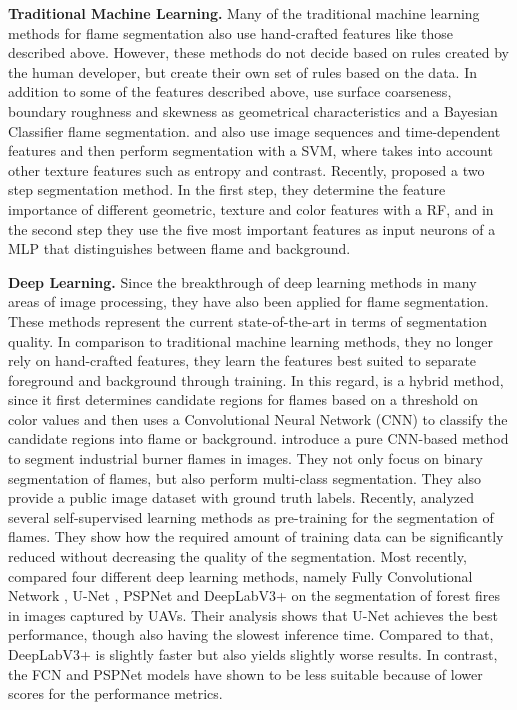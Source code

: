 \documentclass{isprs} %
\begin{document}
\textbf{Traditional Machine Learning.}
Many of the traditional machine learning methods for flame segmentation also use hand-crafted features like those described above. However, these methods do not decide based on rules created by the human developer, but create their own set of rules based on the data. In addition to some of the features described above, \citet{borges2010probabilistic} use surface coarseness, boundary roughness and skewness as geometrical characteristics and a Bayesian Classifier flame segmentation. \citet{zhao2011svm} and \citet{jamali2013outdoor} also use image sequences and time-dependent features and then perform segmentation with a SVM, where \citet{zhao2011svm} takes into account other texture features such as entropy and contrast. Recently, \citet{liang2022random} proposed a two step segmentation method. In the first step, they determine the feature importance of different geometric, texture and color features with a RF, and in the second step they use the five most important features as input neurons of a MLP that distinguishes between flame and background.

\textbf{Deep Learning.}
Since the breakthrough of deep learning methods in many areas of image processing, they have also been applied for flame segmentation. These methods represent the current state-of-the-art in terms of segmentation quality. In comparison to traditional machine learning methods, they no longer rely on hand-crafted features, they learn the features best suited to separate foreground and background through training. In this regard, \citet{zhong2018convolutional} is a hybrid method, since it first determines candidate regions for flames based on a threshold on color values and then uses a Convolutional Neural Network (CNN) to classify the candidate regions into flame or background. \citet{grosskopf2021evaluation} introduce a pure CNN-based method to segment industrial burner flames in images. They not only focus on binary segmentation of flames, but also perform multi-class segmentation. They also provide a public image dataset with ground truth labels. Recently, \citet{landgraf2022evaluation} analyzed several self-supervised learning methods as pre-training for the segmentation of flames. They show how the required amount of training data can be significantly reduced without decreasing the quality of the segmentation. Most recently, \citet{wang2022comparative} compared four different deep learning methods, namely Fully Convolutional Network \citep{long2015fully}, U-Net \citep{ronneberger2015u}, PSPNet \citep{zhao2017pyramid} and DeepLabV3+ \citep{chen2018encoder} on the segmentation of forest fires in images captured by UAVs. Their analysis shows that U-Net achieves the best performance, though also having the slowest inference time. Compared to that, DeepLabV3+ is slightly faster but also yields slightly worse results. In contrast, the FCN and PSPNet models have shown to be less suitable because of lower scores for the performance metrics. 
\end{document}
